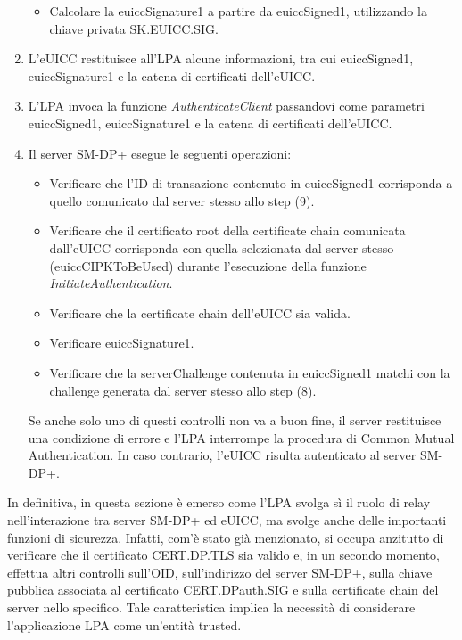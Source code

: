 \documentclass[10pt, oneside]{book}
\begin{document}
\begin{enumerate}
\begin{itemize}[itemsep=0pt]
\item Calcolare la euiccSignature1 a partire da euiccSigned1, utilizzando la chiave privata SK.EUICC.SIG.
\end{itemize}
\item L'eUICC restituisce all'LPA alcune informazioni, tra cui euiccSigned1, euiccSignature1 e la catena di certificati dell'eUICC.
\item L'LPA invoca la funzione \textit{AuthenticateClient} passandovi come parametri euiccSigned1, euiccSignature1 e la catena di certificati dell'eUICC.
\item Il server SM-DP+ esegue le seguenti operazioni:
\begin{itemize}[itemsep=0pt]
\item Verificare che l'ID di transazione contenuto in euiccSigned1 corrisponda a quello comunicato dal server stesso allo step (9).
\item Verificare che il certificato root della certificate chain comunicata dall'eUICC corrisponda con quella selezionata dal server stesso (euiccCIPKToBeUsed) durante l'esecuzione della funzione \textit{InitiateAuthentication}.
\item Verificare che la certificate chain dell'eUICC sia valida.
\item Verificare euiccSignature1.
\item Verificare che la serverChallenge contenuta in euiccSigned1 matchi con la challenge generata dal server stesso allo step (8).
\end{itemize}
Se anche solo uno di questi controlli non va a buon fine, il server restituisce una condizione di errore e l'LPA interrompe la procedura di Common Mutual Authentication. In caso contrario, l'eUICC risulta autenticato al server SM-DP+.
\end{enumerate}
In definitiva, in questa sezione è emerso come l'LPA svolga sì il ruolo di relay nell'interazione tra server SM-DP+ ed eUICC, ma svolge anche delle importanti funzioni di sicurezza. Infatti, com'è stato già menzionato, si occupa anzitutto di verificare che il certificato CERT.DP.TLS sia valido e, in un secondo momento, effettua altri controlli sull'OID, sull'indirizzo del server SM-DP+, sulla chiave pubblica associata al certificato CERT.DPauth.SIG e sulla certificate chain del server nello specifico. Tale caratteristica implica la necessità di considerare l'applicazione LPA come un'entità trusted.
\end{document}
